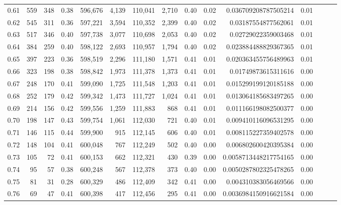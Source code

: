 \begin{tabular}{rrrrrrrrrrrrrrr}
0.61 &     559 &    348 &  0.38 &  596,676 &    4,139 &  110,041 &    2,710 &  0.40 &  0.02 &    0.036709208787505214 &      0.01 \\
0.62 &     545 &    311 &  0.36 &  597,221 &    3,594 &  110,352 &    2,399 &  0.40 &  0.02 &     0.03187554877562061 &      0.01 \\
0.63 &     517 &    346 &  0.40 &  597,738 &    3,077 &  110,698 &    2,053 &  0.40 &  0.02 &     0.02729022359003468 &      0.01 \\
0.64 &     384 &    259 &  0.40 &  598,122 &    2,693 &  110,957 &    1,794 &  0.40 &  0.02 &    0.023884488829367365 &      0.01 \\
0.65 &     397 &    223 &  0.36 &  598,519 &    2,296 &  111,180 &    1,571 &  0.41 &  0.01 &    0.020363455756489963 &      0.01 \\
0.66 &     323 &    198 &  0.38 &  598,842 &    1,973 &  111,378 &    1,373 &  0.41 &  0.01 &     0.01749873615311616 &      0.00 \\
0.67 &     248 &    170 &  0.41 &  599,090 &    1,725 &  111,548 &    1,203 &  0.41 &  0.01 &    0.015299199120185188 &      0.00 \\
0.68 &     252 &    179 &  0.42 &  599,342 &    1,473 &  111,727 &    1,024 &  0.41 &  0.01 &    0.013064185683497265 &      0.00 \\
0.69 &     214 &    156 &  0.42 &  599,556 &    1,259 &  111,883 &      868 &  0.41 &  0.01 &    0.011166198082500377 &      0.00 \\
0.70 &     198 &    147 &  0.43 &  599,754 &    1,061 &  112,030 &      721 &  0.40 &  0.01 &    0.009410116096531295 &      0.00 \\
0.71 &     146 &    115 &  0.44 &  599,900 &      915 &  112,145 &      606 &  0.40 &  0.01 &    0.008115227359402578 &      0.00 \\
0.72 &     148 &    104 &  0.41 &  600,048 &      767 &  112,249 &      502 &  0.40 &  0.00 &    0.006802600420395384 &      0.00 \\
0.73 &     105 &     72 &  0.41 &  600,153 &      662 &  112,321 &      430 &  0.39 &  0.00 &   0.0058713448217754165 &      0.00 \\
0.74 &      95 &     57 &  0.38 &  600,248 &      567 &  112,378 &      373 &  0.40 &  0.00 &   0.0050287802325478265 &      0.00 \\
0.75 &      81 &     31 &  0.28 &  600,329 &      486 &  112,409 &      342 &  0.41 &  0.00 &    0.004310383056469566 &      0.00 \\
0.76 &      69 &     47 &  0.41 &  600,398 &      417 &  112,456 &      295 &  0.41 &  0.00 &   0.0036984150916621584 &      0.00 \\

\end{tabular}

